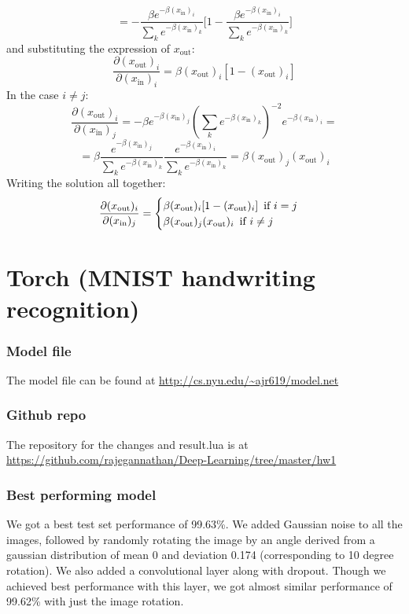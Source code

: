 \documentclass{article}
\begin{document}
\begin{enumerate}
$$
=-\frac{\beta e^{-\beta (x_{\text{in}})_i}}{\sum_k e^{-\beta (x_{\text{in}})_k} } \Big[  1-\frac{\beta e^{-\beta (x_{\text{in}})_i}}{\sum_k e^{-\beta (x_{\text{in}})_k} }\Big]
$$and substituting the expression of $x_{\text{out}}$:
$$
\frac{\partial (x_{\text{out}})_i}{\partial (x_{\text{in}})_i} =\beta  (x_{\text{out}})_i [1- (x_{\text{out}})_i]
$$
In the case $i\neq j$:
$$
\frac{\partial (x_{\text{out}})_i}{\partial (x_{\text{in}})_j} =    
-\beta e^{-\beta (x_{\text{in}})_j} (\sum_k e^{-\beta (x_{\text{in}})_k} )^{-2} e^{-\beta (x_{\text{in}})_i} =
$$ 
$$
=\beta \frac{e^{-\beta (x_{\text{in}})_j}}{\sum_k e^{-\beta (x_{\text{in}})_k} }
\frac{e^{-\beta (x_{\text{in}})_i}}{\sum_k e^{-\beta (x_{\text{in}})_k} } =\beta (x_{\text{out}})_j(x_{\text{out}})_i 
$$
Writing the solution all together:
\begin{equation*}
      \frac{\partial (x_{\text{out}})_i}{\partial (x_{\text{in}})_j} = \begin{cases}
                       \beta  (x_{\text{out}})_i [1- (x_{\text{out}})_i]   \text{\,	if  $i= j$}\\
                        \beta (x_{\text{out}})_j(x_{\text{out}})_i   \text{\,	if  $i\neq j$}
                    \end{cases}
\end{equation*}

\end{enumerate}

\section[Kaggle contest]{Torch (MNIST handwriting recognition)}

\subsubsection{Model file}
  The model file can be found at \href{http://cs.nyu.edu/\textasciitilde ajr619/model.net}{http://cs.nyu.edu/\textasciitilde ajr619/model.net}
\subsubsection{Github repo}
  The repository for the changes and result.lua is at \\
  \href{https://github.com/rajegannathan/Deep-Learning/tree/master/hw1}{https://github.com/rajegannathan/Deep-Learning/tree/master/hw1}
\subsubsection{Best performing model}
We got a best test set performance of 99.63\%.  We added Gaussian noise to all the images, followed by randomly rotating the image by an angle derived from a gaussian distribution of mean 0 and deviation 0.174 (corresponding to 10 degree rotation).  We also added a convolutional layer along with dropout.  Though we achieved best performance with this layer, we got almost similar performance of 99.62\% with just the image rotation.
\end{document}
